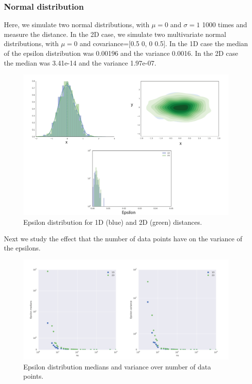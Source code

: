  \subsubsection{Normal distribution}
Here, we simulate two normal distributions, with $\mu=0$ and $\sigma=1$ 1000 times and measure the distance. In the 2D case, we simulate two multivariate normal distributions, with $\mu=0$ and covariance=[0.5 0, 0 0.5]. In the 1D case the median of the epsilon distribution was 0.00196 and the variance 0.0016. In the 2D case the median was 3.41e-14 and the variance 1.97e-07. 

\begin{figure}[H]
\centering
\includegraphics[scale=0.6]{chapterABCFlow/images/epsil_var.png}
\caption{Epsilon distribution for 1D (blue)  and 2D (green) distances.}
\label{fig:epsilon_hist}
\end{figure}

Next we study the effect that the number of data points have on the variance of the epsilons. 

\begin{figure}[htbp]
\centering
\includegraphics[scale=0.5]{chapterABCFlow/images/ns.png}
\caption{Epsilon distribution medians and variance over number of data points.}
\label{fig:epsilon_ns}
\end{figure}

